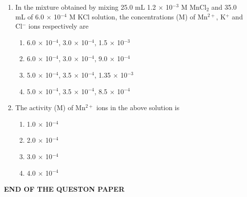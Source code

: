 \documentclass[journal,12pt,onecolumn]{IEEEtran}
\theoremstyle{remark}
\begin{document}
\begin{enumerate}
\item  In the mixture obtained by mixing 25.0 mL 1.2 $\times$ 10$^{-3}$ M MnCl$_2$ and 35.0 mL of 6.0 $\times$ 10$^{-4}$ M KCl solution, the concentrations (M) of Mn$^{2+}$, K$^+$ and Cl$^-$ ions respectively are \hfill{}
\begin{multicols}{2}
\begin{enumerate} 
    \item 6.0 $\times$ 10$^{-4}$, 3.0 $\times$ 10$^{-4}$, 1.5 $\times$ 10$^{-3}$
    \item 6.0 $\times$ 10$^{-4}$, 3.0 $\times$ 10$^{-4}$, 9.0 $\times$ 10$^{-4}$
    \item 5.0 $\times$ 10$^{-4}$, 3.5 $\times$ 10$^{-4}$, 1.35 $\times$ 10$^{-3}$
    \item 5.0 $\times$ 10$^{-4}$, 3.5 $\times$ 10$^{-4}$, 8.5 $\times$ 10$^{-4}$
\end{enumerate}
\end{multicols}

\item  The activity (M) of Mn$^{2+}$ ions in the above solution is \hfill{}
\begin{multicols}{2}
\begin{enumerate} 
    \item 1.0 $\times$ 10$^{-4}$
    \item 2.0 $\times$ 10$^{-4}$
    \item 3.0 $\times$ 10$^{-4}$
    \item 4.0 $\times$ 10$^{-4}$
\end{enumerate}
\end{multicols}

\end{enumerate}
\begin{center}
    \textbf{END OF THE QUESTON PAPER}
\end{center}
\end{document}
